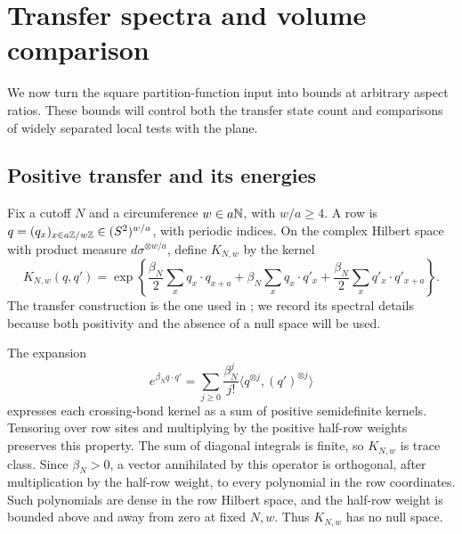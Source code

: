 \section{Transfer spectra and volume comparison}
\label{sec:transfer}

We now turn the square partition-function input into bounds at arbitrary
aspect ratios.  These bounds will control both the transfer state count
and comparisons of widely separated local tests with the plane.

\subsection{Positive transfer and its energies}

Fix a cutoff $N$ and a circumference $w\in a\mathbb N$, with $w/a\ge4$.
A row is $q=(q_x)_{x\in a\mathbb Z/w\mathbb Z}\in(S^2)^{w/a}$, with periodic
indices.  On the complex Hilbert space with product measure
$d\sigma^{\otimes w/a}$, define $K_{N,w}$ by the kernel
\begin{equation}
 K_{N,w}(q,q')=
 \exp\!\left\{
 \frac{\beta_N}{2}\sum_x q_x\cdot q_{x+a}
 +\beta_N\sum_x q_x\cdot q'_x
 +\frac{\beta_N}{2}\sum_x q'_x\cdot q'_{x+a}
 \right\}.
 \label{tra:kernel}
\end{equation}
The transfer construction is the one used in
\cite[Section~8.2]{OpenAI-O3}; we record its spectral details because
both positivity and the absence of a null space will be used.

The expansion
\[
 e^{\beta_N q\cdot q'}
 =\sum_{j\ge0}\frac{\beta_N^j}{j!}
        \langle q^{\otimes j},(q')^{\otimes j}\rangle
\]
expresses each crossing-bond kernel as a sum of positive semidefinite
kernels.  Tensoring over row sites and multiplying by the positive
half-row weights preserves this property.  The sum of diagonal
integrals is finite, so $K_{N,w}$ is trace class.  Since $\beta_N>0$,
a vector annihilated by this operator is orthogonal, after multiplication
by the half-row weight, to every polynomial in the row coordinates.
Such polynomials are dense in the row Hilbert space, and the half-row
weight is bounded above and away from zero at fixed $N,w$.
Thus $K_{N,w}$ has no null space.

